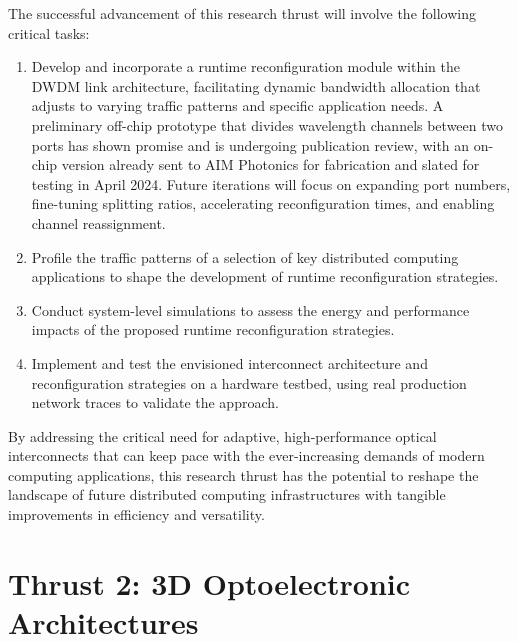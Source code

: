 The successful advancement of this research thrust will involve the following critical tasks:
\begin{enumerate}[nosep]
    \item Develop and incorporate a runtime reconfiguration module within the DWDM link architecture, facilitating dynamic bandwidth allocation that adjusts to varying traffic patterns and specific application needs. A preliminary off-chip prototype that divides wavelength channels between two ports has shown promise and is undergoing publication review, with an on-chip version already sent to AIM Photonics for fabrication and slated for testing in April 2024. Future iterations will focus on expanding port numbers, fine-tuning splitting ratios, accelerating reconfiguration times, and enabling channel reassignment.
    \item Profile the traffic patterns of a selection of key distributed computing applications to shape the development of runtime reconfiguration strategies.
    \item Conduct system-level simulations to assess the energy and performance impacts of the proposed runtime reconfiguration strategies.
    \item Implement and test the envisioned interconnect architecture and reconfiguration strategies on a hardware testbed, using real production network traces to validate the approach.
\end{enumerate}
By addressing the critical need for adaptive, high-performance optical interconnects that can keep pace with the ever-increasing demands of modern computing applications, this research thrust has the potential to reshape the landscape of future distributed computing infrastructures with tangible improvements in efficiency and versatility.


\section{Thrust 2: 3D Optoelectronic Architectures}

